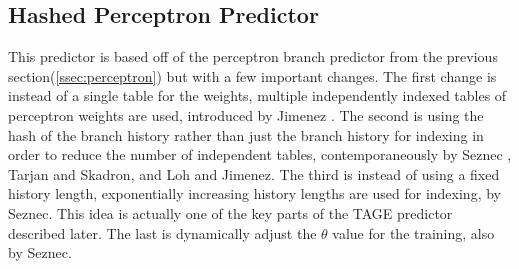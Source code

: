 \documentclass[conference]{IEEEtran}
\begin{document}
\subsection{Hashed Perceptron Predictor} \label{ssec::hp}
This predictor is based off of the perceptron branch predictor from the previous section(\ref{ssec:perceptron}) but with a few important changes. The first change is instead of a single table for the weights, multiple independently indexed tables of perceptron weights are used, introduced by Jimenez \cite{jimenez2003}.  The second is using the hash of the branch history rather than just the branch history for indexing in order to reduce the number of independent tables, contemporaneously by Seznec \cite{seznec2004}, Tarjan and Skadron\cite{skadron2004}, and Loh and Jimenez\cite{loh2005reducing}.  The third is instead of using a fixed history length, exponentially increasing history lengths are used for indexing, by Seznec\cite{seznec2004gehl}\cite{seznec2005analysis}. This idea is actually one of the key parts of the TAGE predictor described later. The last is dynamically adjust the $\theta$ value for the training, also by Seznec\cite{seznec2004gehl}\cite{seznec2005analysis}.





\vspace{12pt}
\end{document}
